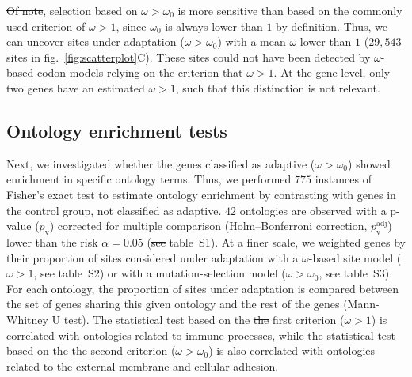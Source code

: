 \documentclass{article}
\providecommand{\DIFaddtex}[1]{{\protect\color{blue}\uwave{#1}}} %
\providecommand{\DIFdeltex}[1]{{\protect\color{red}\sout{#1}}}                      %
\providecommand{\DIFaddbegin}{} %
\providecommand{\DIFaddend}{} %
\providecommand{\DIFdelbegin}{} %
\providecommand{\DIFdelend}{} %
\providecommand{\DIFadd}[1]{\texorpdfstring{\DIFaddtex{#1}}{#1}} %
\providecommand{\DIFdel}[1]{\texorpdfstring{\DIFdeltex{#1}}{}} %
\newcommand{\DIFscaledelfig}{0.5}
\newlength{\DIFdelgraphicswidth} %
\newlength{\DIFdelgraphicsheight} %
\newcommand{\DIFaddincludegraphics}[2][]{{\color{blue}\fbox{\DIFOincludegraphics[#1]{#2}}}} %
\newcommand{\DIFdelincludegraphics}[2][]{%
\sbox{\DIFdelgraphicsbox}{\DIFOincludegraphics[#1]{#2}}%
\settoboxwidth{\DIFdelgraphicswidth}{\DIFdelgraphicsbox} %
\settoboxtotalheight{\DIFdelgraphicsheight}{\DIFdelgraphicsbox} %
\scalebox{\DIFscaledelfig}{%
\parbox[b]{\DIFdelgraphicswidth}{\usebox{\DIFdelgraphicsbox}\\[-\baselineskip] \rule{\DIFdelgraphicswidth}{0em}}\llap{\resizebox{\DIFdelgraphicswidth}{\DIFdelgraphicsheight}{%
\setlength{\unitlength}{\DIFdelgraphicswidth}%
\begin{picture}(1,1)%
\thicklines\linethickness{2pt} %
{\color[rgb]{1,0,0}\put(0,0){\framebox(1,1){}}}%
{\color[rgb]{1,0,0}\put(0,0){\line( 1,1){1}}}%
{\color[rgb]{1,0,0}\put(0,1){\line(1,-1){1}}}%
\end{picture}%
}\hspace*{3pt}}} %
} %
\DeclareRobustCommand{\DIFaddbegin}{\DIFOaddbegin \let\includegraphics\DIFaddincludegraphics} %
\DeclareRobustCommand{\DIFaddend}{\DIFOaddend \let\includegraphics\DIFOincludegraphics} %
\DeclareRobustCommand{\DIFdelbegin}{\DIFOdelbegin \let\includegraphics\DIFdelincludegraphics} %
\DeclareRobustCommand{\DIFdelend}{\DIFOaddend \let\includegraphics\DIFOincludegraphics} %
\begin{document}
    \DIFdelbegin \DIFdel{Of note}\DIFdelend \DIFaddbegin \DIFadd{Remarkably}\DIFaddend , selection based on $\omega>\omega_{0}$ is more sensitive than based on the commonly used criterion of $\omega>1$, since $\omega_{0}$ is always lower than $1$ by definition\cite{spielman_relationship_2015}.
    Thus, we can uncover sites under adaptation ($\omega>\omega_{0}$) with a mean $\omega$ lower than $1$ ($29,543$ sites in fig.~\ref{fig:scatterplot}C).
    These sites could not have been detected by $\omega$-based codon models relying on the criterion that $\omega>1$.
    At the gene level, only two genes have an estimated $\omega > 1$, such that this distinction is not relevant.

    \subsection*{Ontology enrichment tests}
    Next, we investigated whether the genes classified as adaptive ($\omega > \omega_{0}$) showed enrichment in specific ontology terms.
    Thus, we performed $775$ instances of Fisher's exact test to estimate ontology enrichment by contrasting with genes in the control group, not classified as adaptive.
    $42$ ontologies are observed with a p-value ($p_{\mathrm{v}}$) corrected for multiple comparison (Holm–Bonferroni correction, $p_{\mathrm{v}}^{\mathrm{adj}}$) lower than the risk $\alpha=0.05$ (\DIFdelbegin \DIFdel{see }\DIFdelend table~S1).
    At a finer scale, we weighted genes by their proportion of sites considered under adaptation with a $\omega$-based site model ($\omega > 1$, \DIFdelbegin \DIFdel{see }\DIFdelend table~S2) or with a mutation-selection model ($\omega > \omega_{0}$, \DIFdelbegin \DIFdel{see }\DIFdelend table~S3).
    For each ontology, the proportion of sites under adaptation is compared between the set of genes sharing this given ontology and the rest of the genes (Mann-Whitney U test).
    The statistical test based on the \DIFdelbegin \DIFdel{the }\DIFdelend first criterion ($\omega>1$) is correlated with ontologies related to immune processes, while the statistical test based on the the second criterion ($\omega > \omega_{0}$) is also correlated with ontologies related to the external membrane and cellular adhesion.
\end{document}
